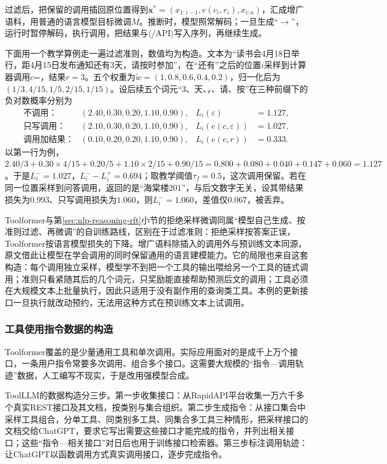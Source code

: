 过滤后，把保留的调用插回原位置得到$\bm{x}^*=(x_{1:i-1},e(c_i,r_i),x_{i:n})$，汇成增广语料，用普通的语言模型目标微调$M$。推断时，模型照常解码；一旦生成“$\to$”，运行时暂停解码，执行调用，把结果与$\langle/\mathrm{API}\rangle$写入序列，再继续生成。

下面用一个教学算例走一遍过滤准则，数值均为构造。文本为“读书会4月18日举行，距4月15日发布通知还有3天，请按时参加”，在“还有”之后的位置$i$采样到计算器调用$c$=，结果$r=3$。五个权重为$\tilde w=(1,0.8,0.6,0.4,0.2)$，归一化后为$(1/3,4/15,1/5,2/15,1/15)$。设后续五个词元“3、天、，、请、按”在三种前缀下的负对数概率分别为
\[
\begin{aligned}
 \text{不调用：}&(2.40,0.30,0.20,1.10,0.90), & L_i(\varepsilon)&=1.127,\\
 \text{只写调用：}&(2.10,0.30,0.20,1.10,0.90), & L_i(e(c,\varepsilon))&=1.027,\\
 \text{调用加结果：}&(0.10,0.20,0.20,1.10,0.90), & L_i(e(c,r))&=0.333.
\end{aligned}
\]
以第一行为例，$2.40/3+0.30\times4/15+0.20/5+1.10\times2/15+0.90/15=0.800+0.080+0.040+0.147+0.060=1.127$。于是$L_i^-=1.027$，$L_i^--L_i^+=0.694$；取教学阈值$\tau_f=0.5$，这次调用保留。若在同一位置采样到问答调用，返回的是“海棠楼201”，与后文数字无关，设其带结果损失为$0.993$、只写调用损失为$1.060$，则$L_i^-=1.060$，差值仅$0.067$，被丢弃。

Toolformer与第\ref{sec:nlp-reasoning-rft}小节的拒绝采样微调同属“模型自己生成、按准则过滤、再微调”的自训练路线，区别在于过滤准则：拒绝采样按答案正误，Toolformer按语言模型损失的下降。增广语料除插入的调用外与预训练文本同源，原文借此让模型在学会调用的同时保留通用的语言建模能力。它的局限也来自这套构造：每个调用独立采样，模型学不到把一个工具的输出喂给另一个工具的链式调用；准则只看紧随其后的几个词元，只奖励能直接帮助预测后文的调用；工具必须在大规模文本上批量执行，因此只适用于没有副作用的查询类工具。本例的更新接口一旦执行就改动预约，无法用这种方式在预训练文本上试调用。

\subsubsection{工具使用指令数据的构造}
\label{sec:nlp-execution-tool-data}

Toolformer覆盖的是少量通用工具和单次调用。实际应用面对的是成千上万个接口，一条用户指令常要多次调用、组合多个接口。这需要大规模的“指令—调用轨迹”数据，人工编写不现实，于是改用强模型合成。

ToolLLM的数据构造分三步。第一步收集接口：从RapidAPI平台收集一万六千多个真实REST接口及其文档，按类别与集合组织。第二步生成指令：从接口集合中采样工具组合，分单工具、同类别多工具、同集合多工具三种情形，把采样接口的文档交给ChatGPT，要求它写出需要这些接口才能完成的指令，并列出相关接口；这些“指令—相关接口”对日后也用于训练接口检索器。第三步标注调用轨迹：让ChatGPT以函数调用方式真实调用接口，逐步完成指令。

